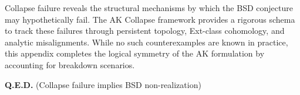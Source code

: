 \documentclass[11pt]{article}
\begin{document}
Collapse failure reveals the structural mechanisms by which the BSD conjecture may hypothetically fail. The AK Collapse framework provides a rigorous schema to track these failures through persistent topology, Ext-class cohomology, and analytic misalignments. While no such counterexamples are known in practice, this appendix completes the logical symmetry of the AK formulation by accounting for breakdown scenarios.

\begin{center}
\textbf{Q.E.D.} (Collapse failure implies BSD non-realization)
\end{center}
\end{document}
